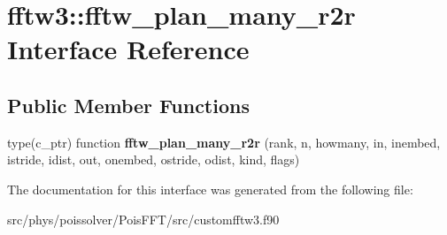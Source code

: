 \hypertarget{interfacefftw3_1_1fftw__plan__many__r2r}{}\section{fftw3\+:\+:fftw\+\_\+plan\+\_\+many\+\_\+r2r Interface Reference}
\label{interfacefftw3_1_1fftw__plan__many__r2r}
\subsection*{Public Member Functions}
\begin{DoxyCompactItemize}
\item 
type(c\+\_\+ptr) function {\bfseries fftw\+\_\+plan\+\_\+many\+\_\+r2r} (rank, n, howmany, in, inembed, istride, idist, out, onembed, ostride, odist, kind, flags)\hypertarget{interfacefftw3_1_1fftw__plan__many__r2r_a6ce133ea8837a0c8450ef87fcb316a30}{}\label{interfacefftw3_1_1fftw__plan__many__r2r_a6ce133ea8837a0c8450ef87fcb316a30}

\end{DoxyCompactItemize}


The documentation for this interface was generated from the following file\+:\begin{DoxyCompactItemize}
\item 
src/phys/poissolver/\+Pois\+F\+F\+T/src/customfftw3.\+f90\end{DoxyCompactItemize}
